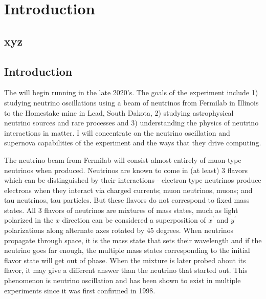 \chapter{Introduction}
\label{ch:intro}

\section{xyz}
\label{sec:intro:xyz}  %



\section{Introduction}

The   will begin running in the late 2020's.  The goals of the experiment include 1) studying neutrino oscillations using a beam of neutrinos from Fermilab in Illinois to the Homestake mine in Lead, South Dakota, 2) studying  astrophysical neutrino sources and rare processes and 3) understanding  the physics of neutrino interactions in matter.   I will concentrate on the neutrino oscillation and supernova capabilities of the experiment and the ways that they drive computing. 

The neutrino beam from Fermilab will consist almost entirely of muon-type neutrinos when produced.  Neutrinos are known to come in (at least) 3 flavors which can be distinguished by their interactions - electron type neutrinos produce electrons when they interact via charged currents; muon neutrinos, muons; and tau neutrinos, tau particles.  But these flavors do not correspond to fixed mass states.  All 3 flavors of neutrinos are mixtures of mass states, much as  light polarized in the $x$ direction  can be considered a superposition of  $x^\prime$ and $y^\prime$ polarizations along  alternate axes rotated by 45 degrees.  When neutrinos propagate through space, it is the mass state that sets their wavelength and if the neutrino goes far enough, the multiple mass states  corresponding to the initial flavor state will get out of phase.  When the mixture is later probed about its flavor, it  may give a different answer than the neutrino that started out. This phenomenon is neutrino oscillation and has been shown to exist in multiple experiments since it was first confirmed in 1998\cite{Kajita2006}.


